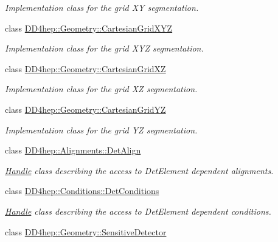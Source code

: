 \begin{DoxyCompactItemize}
\begin{DoxyCompactList}\small\item\em Implementation class for the grid XY segmentation. \item\end{DoxyCompactList}\item 
class \hyperlink{class_d_d4hep_1_1_geometry_1_1_cartesian_grid_x_y_z}{DD4hep::Geometry::CartesianGridXYZ}
\begin{DoxyCompactList}\small\item\em Implementation class for the grid XYZ segmentation. \item\end{DoxyCompactList}\item 
class \hyperlink{class_d_d4hep_1_1_geometry_1_1_cartesian_grid_x_z}{DD4hep::Geometry::CartesianGridXZ}
\begin{DoxyCompactList}\small\item\em Implementation class for the grid XZ segmentation. \item\end{DoxyCompactList}\item 
class \hyperlink{class_d_d4hep_1_1_geometry_1_1_cartesian_grid_y_z}{DD4hep::Geometry::CartesianGridYZ}
\begin{DoxyCompactList}\small\item\em Implementation class for the grid YZ segmentation. \item\end{DoxyCompactList}\item 
class \hyperlink{class_d_d4hep_1_1_alignments_1_1_det_align}{DD4hep::Alignments::DetAlign}
\begin{DoxyCompactList}\small\item\em \hyperlink{class_d_d4hep_1_1_handle}{Handle} class describing the access to DetElement dependent alignments. \item\end{DoxyCompactList}\item 
class \hyperlink{class_d_d4hep_1_1_conditions_1_1_det_conditions}{DD4hep::Conditions::DetConditions}
\begin{DoxyCompactList}\small\item\em \hyperlink{class_d_d4hep_1_1_handle}{Handle} class describing the access to DetElement dependent conditions. \item\end{DoxyCompactList}\item 
class \hyperlink{class_d_d4hep_1_1_geometry_1_1_sensitive_detector}{DD4hep::Geometry::SensitiveDetector}

\end{DoxyCompactItemize}
